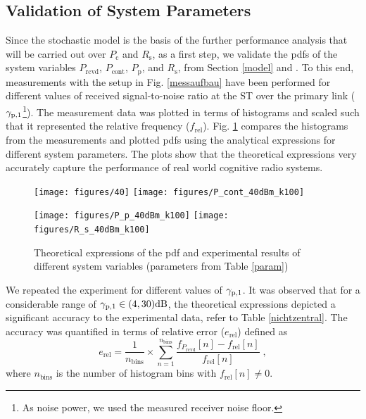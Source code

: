 \subsection{Validation of System Parameters}

Since the stochastic model is the basis of the further performance analysis that will be carried out over $P_\textrm{c}$ and $R_\textrm{s}$, as a first step, we validate the pdfs of the system variables $P_\textrm{rcvd}$, $P_\textrm{cont}$, $P_\textrm{p}$, and $R_\textrm{s}$, from Section \ref{model} and \cite{Kaushik15}. To this end, measurements with the setup in Fig. \ref{messaufbau} have been performed for different values of received signal-to-noise ratio at the ST over the primary link (${\gamma}_{\text{p,1}}$\footnote{As noise power, we used the measured receiver noise floor.}). The measurement data was plotted in terms of histograms and scaled such that it represented the relative frequency ($f_\textrm{rel}$). Fig. \ref{hrel_pdf} compares the histograms from the measurements and plotted pdfs using the analytical expressions for different system parameters. The plots show that the theoretical expressions very accurately capture the performance of real world cognitive radio systems.

\begin{figure}
	\centering
	\texttt{[image: figures/40]}%
	\texttt{[image: figures/P\_cont\_40dBm\_k100]}%
	
	\texttt{[image: figures/P\_p\_40dBm\_k100]}%
	\texttt{[image: figures/R\_s\_40dBm\_k100]}%
	\caption{Theoretical expressions of the pdf and experimental results of different system variables (parameters from Table \ref{param})}
	\label{hrel_pdf}
\end{figure}

We repeated the experiment for different values of ${\gamma}_{\text{p,1}}$. It was observed that for a considerable range of ${\gamma}_{\text{p,1}} \in (4,30)\SI{}{dB}$, the theoretical expressions depicted a significant accuracy to the experimental data, refer to Table \ref{nichtzentral}. The accuracy was quantified in terms of relative error ($e_\textrm{rel}$) defined as
\begin{equation}
\label{fr}
e_\textrm{rel} = \frac{1}{n_\textrm{bins}} \times \sum_{n=1}^{n_\textrm{bins}} \frac{f_{P_\textrm{rcvd}}[n] - f_\textrm{rel}[n]}{f_\textrm{rel}[n]} \;  , 
\end{equation}
where $n_\textrm{bins}$ is the number of histogram bins with $f_\textrm{rel}[n] \neq 0$.

